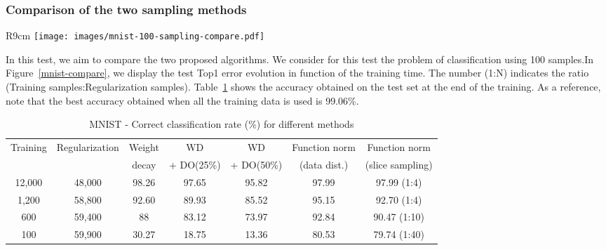 \documentclass{article}
\begin{document}
\subsubsection{Comparison of the two sampling methods}
\begin{wrapfigure}{R}{9cm}
\centering
\texttt{[image: images/mnist-100-sampling-compare.pdf]}
\caption{MNIST - Sampling method comparison -  Test Top1-error evolution in time}
\label{mnist-compare}
\end{wrapfigure}
In this test, we aim to compare the two proposed algorithms. We consider for this test the problem of classification using 100 samples.In Figure~\ref{mnist-compare}, we display the test Top1 error evolution in function of the training time. The number (1:N) indicates the ratio (Training samples:Regularization samples). Table~\ref{mnist-correct} shows the accuracy obtained on the test set at the end of the training. As a reference, note that the best accuracy obtained when all the training data is used is 99.06\%.


\begin{table}[ht!]
\centering
\begin{tabular}{|c|c||c|c|c|c|c|}
\hline
Training & Regularization & Weight & WD &WD & Function norm  & Function norm\\
& & decay &  + DO(25\%)& + DO(50\%)  &(data dist.)&(slice sampling)\\
\hline
\hline
12,000 & 48,000 & 98.26 & 97.65 & 95.82 & 97.99 &  97.99 (1:4)\\
1,200 & 58,800 & 92.60 & 89.93 & 85.52 & 95.15 & 92.70 (1:4)\\
600 & 59,400 & 88 & 83.12 & 73.97 & 92.84 & 90.47 (1:10)\\
100 & 59,900 & 30.27 & 18.75 & 13.36 & 80.53 & 79.74 (1:40)\\
\hline
\end{tabular}
\caption{MNIST - Correct classification rate (\%) for different methods}
\label{mnist-correct}
\end{table}
\end{document}
